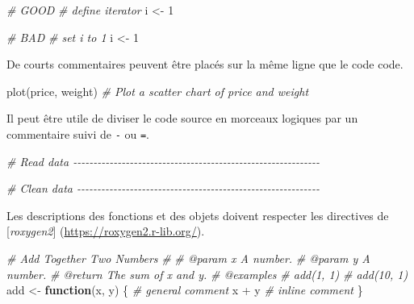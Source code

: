\documentclass[
  french,
]{scrbook}
\newenvironment{Shaded}{\begin{snugshade}}{\end{snugshade}}
\newcommand{\CommentTok}[1]{\textcolor[rgb]{0.56,0.35,0.01}{\textit{#1}}}
\newcommand{\ControlFlowTok}[1]{\textcolor[rgb]{0.13,0.29,0.53}{\textbf{#1}}}
\newcommand{\DecValTok}[1]{\textcolor[rgb]{0.00,0.00,0.81}{#1}}
\newcommand{\FunctionTok}[1]{\textcolor[rgb]{0.00,0.00,0.00}{#1}}
\newcommand{\NormalTok}[1]{#1}
\newcommand{\OtherTok}[1]{\textcolor[rgb]{0.56,0.35,0.01}{#1}}
\newcommand{\SpecialCharTok}[1]{\textcolor[rgb]{0.00,0.00,0.00}{#1}}
\begin{document}
\begin{Shaded}
\begin{Highlighting}[]
\CommentTok{\# GOOD}
\CommentTok{\# define iterator}
\NormalTok{i }\OtherTok{\textless{}{-}} \DecValTok{1}

\CommentTok{\# BAD}
\CommentTok{\# set i to 1}
\NormalTok{i }\OtherTok{\textless{}{-}} \DecValTok{1}
\end{Highlighting}
\end{Shaded}

De courts commentaires peuvent être placés sur la même ligne que le code code.

\begin{Shaded}
\begin{Highlighting}[]
\FunctionTok{plot}\NormalTok{(price, weight) }\CommentTok{\# Plot a scatter chart of price and weight}
\end{Highlighting}
\end{Shaded}

Il peut être utile de diviser le code source en morceaux logiques par un commentaire suivi de \texttt{-} ou \texttt{=}.

\begin{Shaded}
\begin{Highlighting}[]
\CommentTok{\# Read data {-}{-}{-}{-}{-}{-}{-}{-}{-}{-}{-}{-}{-}{-}{-}{-}{-}{-}{-}{-}{-}{-}{-}{-}{-}{-}{-}{-}{-}{-}{-}{-}{-}{-}{-}{-}{-}{-}{-}{-}{-}{-}{-}{-}{-}{-}{-}{-}{-}{-}{-}{-}{-}{-}{-}{-}{-}{-}{-}{-}{-}}

\CommentTok{\# Clean data {-}{-}{-}{-}{-}{-}{-}{-}{-}{-}{-}{-}{-}{-}{-}{-}{-}{-}{-}{-}{-}{-}{-}{-}{-}{-}{-}{-}{-}{-}{-}{-}{-}{-}{-}{-}{-}{-}{-}{-}{-}{-}{-}{-}{-}{-}{-}{-}{-}{-}{-}{-}{-}{-}{-}{-}{-}{-}{-}{-}}
\end{Highlighting}
\end{Shaded}

Les descriptions des fonctions et des objets doivent respecter les directives de {[}\emph{roxygen2}{]} (\url{https://roxygen2.r-lib.org/}).

\begin{Shaded}
\begin{Highlighting}[]
\CommentTok{\#\textquotesingle{} Add Together Two Numbers}
\CommentTok{\#\textquotesingle{} }
\CommentTok{\#\textquotesingle{} @param x A number.}
\CommentTok{\#\textquotesingle{} @param y A number.}
\CommentTok{\#\textquotesingle{} @return The sum of x and y.}
\CommentTok{\#\textquotesingle{} @examples}
\CommentTok{\#\textquotesingle{} add(1, 1)}
\CommentTok{\#\textquotesingle{} add(10, 1)}
\NormalTok{add }\OtherTok{\textless{}{-}} \ControlFlowTok{function}\NormalTok{(x, y) \{}
  \CommentTok{\# general comment}
\NormalTok{  x }\SpecialCharTok{+}\NormalTok{ y }\CommentTok{\# inline comment}
\NormalTok{\}}
\end{Highlighting}
\end{Shaded}

\backmatter
{}

\printbibliography[heading=bibintoc]
\end{document}
